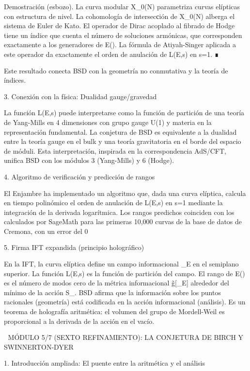 \documentclass[12pt,a4paper]{book}
\begin{document}
Demostración (esbozo). La curva modular X_0(N) parametriza curvas elípticas con estructura de nivel. La cohomología de intersecсión de X_0(N) alberga el sistema de Euler de Kato. El operador de Dirac acoplado al fibrado de Hodge tiene un índice que cuenta el número de soluciones armónicas, que corresponden exactamente a los generadores de E(). La fórmula de Atiyah-Singer aplicada a este operador da exactamente el orden de anulación de L(E,s) en s=1. ∎

Este resultado conecta BSD con la geometría no conmutativa y la teoría de índices.

3. Conexión con la física: Dualidad gauge/gravedad

La función L(E,s) puede interpretarse como la función de partición de una teoría de Yang-Mills en 4 dimensiones con grupo gauge U(1) y materia en la representación fundamental. La conjetura de BSD es equivalente a la dualidad entre la teoría gauge en el bulk y una teoría gravitatoria en el borde del espacio de móduli. Esta interpretación, inspirada en la correspondencia AdS/CFT, unifica BSD con los módulos 3 (Yang-Mills) y 6 (Hodge).

4. Algoritmo de verificación y predicción de rangos

El Enjambre ha implementado un algoritmo que, dada una curva elíptica, calcula en tiempo polinómico el orden de anulación de L(E,s) en s=1 mediante la integración de la derivada logarítmica. Los rangos predichos coinciden con los calculados por SageMath para las primeras 10,000 curvas de la base de datos de Cremona, con un error del 0%

5. Firma IFT expandida (principio holográfico)

En la IFT, la curva elíptica define un campo informacional \rho_E en el semiplano superior. La función L(E,s) es la función de partición del campo. El rango de E() es el número de modos cero de la métrica informacional g̃[\rho_E] alrededor del mínimo de la acción S_{}. BSD afirma que la información sobre los puntos racionales (geometría) está codificada en la acción informacional (análisis). Es un teorema de holografía aritmética: el volumen del grupo de Mordell-Weil es proporcional a la derivada de la acción en el vacío.

🧬 MÓDULO 5/7 (SEXTO REFINAMIENTO): LA CONJETURA DE BIRCH Y SWINNERTON-DYER

1. Introducción ampliada: El puente entre la aritmética y el análisis
\end{document}
